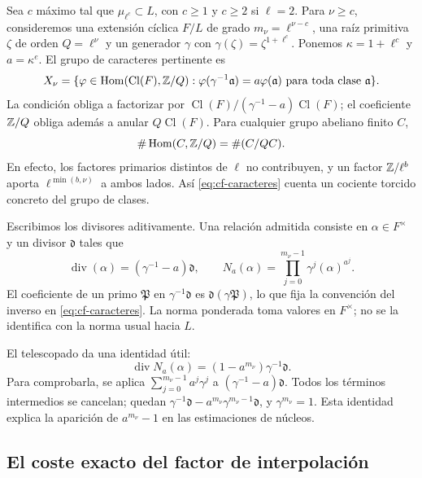 Sea $c$ máximo tal que $\mu_{\ell^c}\subset L$, con $c\ge1$
y $c\ge2$ si $\ell=2$. Para $\nu\ge c$, consideremos una
extensión cíclica $F/L$ de grado $m_\nu=\ell^{\nu-c}$, una raíz
primitiva $\zeta$ de orden $Q=\ell^\nu$ y un generador
$\gamma$ con $\gamma(\zeta)=\zeta^{1+\ell^c}$.
Ponemos $\kappa=1+\ell^c$ y $a=\kappa^e$.
El grupo de caracteres pertinente es
\begin{equation}
 X_\nu=
 \{\varphi\in\operatorname{Hom}(\operatorname{Cl}(F),\mathbb{Z}/Q):
   \varphi(\gamma^{-1}\mathfrak a)=a\varphi(\mathfrak a)
   \text{ para toda clase }\mathfrak a\}.
 \label{eq:cf-caracteres}
\end{equation}
La condición obliga a factorizar por
$\operatorname{Cl}(F)/(\gamma^{-1}-a)\operatorname{Cl}(F)$;
el coeficiente $\mathbb{Z}/Q$ obliga además a anular $Q\operatorname{Cl}(F)$.
Para cualquier grupo abeliano finito $C$,
\[
 \#\operatorname{Hom}(C,\mathbb{Z}/Q)=\#(C/QC).
\]
En efecto, los factores primarios distintos de $\ell$ no contribuyen,
y un factor $\mathbb{Z}/\ell^b$ aporta $\ell^{\min(b,\nu)}$ a ambos
lados. Así \eqref{eq:cf-caracteres} cuenta un cociente torcido
concreto del grupo de clases.

Escribimos los divisores aditivamente. Una relación admitida consiste
en $\alpha\in F^\times$ y un divisor $\mathfrak d$ tales que
\begin{equation}
 \operatorname{div}(\alpha)=(\gamma^{-1}-a)\mathfrak d,
 \qquad
 N_a(\alpha)=\prod_{j=0}^{m_\nu-1}\gamma^j(\alpha)^{a^j}.
 \label{eq:cf-norma}
\end{equation}
El coeficiente de un primo $\mathfrak P$ en $\gamma^{-1}\mathfrak d$
es $\mathfrak d(\gamma\mathfrak P)$, lo que fija la convención
del inverso en \eqref{eq:cf-caracteres}.
La norma ponderada toma valores en $F^\times$; no se la identifica
con la norma usual hacia $L$.

El telescopado da una identidad útil:
\begin{equation}
 \operatorname{div}N_a(\alpha)
 =(1-a^{m_\nu})\gamma^{-1}\mathfrak d.
 \label{eq:cf-norma-divisor}
\end{equation}
Para comprobarla, se aplica $\sum_{j=0}^{m_\nu-1}a^j\gamma^j$
a $(\gamma^{-1}-a)\mathfrak d$. Todos los términos intermedios
se cancelan; quedan $\gamma^{-1}\mathfrak d-a^{m_\nu}\gamma^{m_\nu-1}\mathfrak d$,
y $\gamma^{m_\nu}=1$. Esta identidad explica la aparición de $a^{m_\nu}-1$
en las estimaciones de núcleos.

\subsection{El coste exacto del factor de interpolación}


